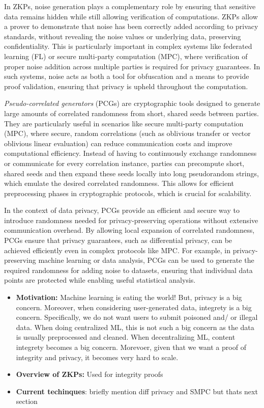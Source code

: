 \documentclass[11pt]{article}
\begin{document}
    In ZKPs, noise generation plays a complementary role by ensuring that sensitive data remains hidden while still allowing verification of computations.
    ZKPs allow a prover to demonstrate that noise has been correctly added according to privacy standards, without revealing the noise values or underlying data, preserving confidentiality. 
    This is particularly important in complex systems like federated learning (FL) or secure multi-party computation (MPC), where verification of proper noise addition across multiple parties is required for privacy guarantees. 
    In such systems, noise acts as both a tool for obfuscation and a means to provide proof validation, ensuring that privacy is upheld throughout the computation.
    
    \emph{Pseudo-correlated generators} (PCGs) are cryptographic tools designed to generate large amounts of correlated randomness from short, shared seeds between parties. 
    They are particularly useful in scenarios like secure multi-party computation (MPC), where secure, random correlations (such as oblivious transfer or vector oblivious linear evaluation) can reduce communication costs and improve computational efficiency. 
    Instead of having to continuously exchange randomness or communicate for every correlation instance, parties can precompute short, shared seeds and then expand these seeds locally into long pseudorandom strings, which emulate the desired correlated randomness. 
    This allows for efficient preprocessing phases in cryptographic protocols, which is crucial for scalability.

    In the context of data privacy, PCGs provide an efficient and secure way to introduce randomness needed for privacy-preserving operations without extensive communication overhead. 
    By allowing local expansion of correlated randomness, PCGs ensure that privacy guarantees, such as differential privacy, can be achieved efficiently even in complex protocols like MPC. 
    For example, in privacy-preserving machine learning or data analysis, PCGs can be used to generate the required randomness for adding noise to datasets, ensuring that individual data points are protected while enabling useful statistical analysis.
\begin{itemize}
    \item \textbf{Motivation:} Machine learning is eating the world! But, privacy is a big concern.
	    Moreover, when considering user-generated data, integrety is a big concern.
	    Specifically, we do not want users to submit poisoned and/ or illegal data.
	    When doing centralized ML, this is not such a big concern as the data is usually preprocessed and cleaned.
	    When decentralizing ML, content integrety becomes a big concern.
	    Morevoer, given that we want a proof of integrity and privacy, it becomes very hard to scale.

    \item \textbf{Overview of ZKPs:} Used for integrity proofs
    \item \textbf{Current techinques}: briefly mention diff privacy and SMPC but thats next section
\end{itemize}
\end{document}
